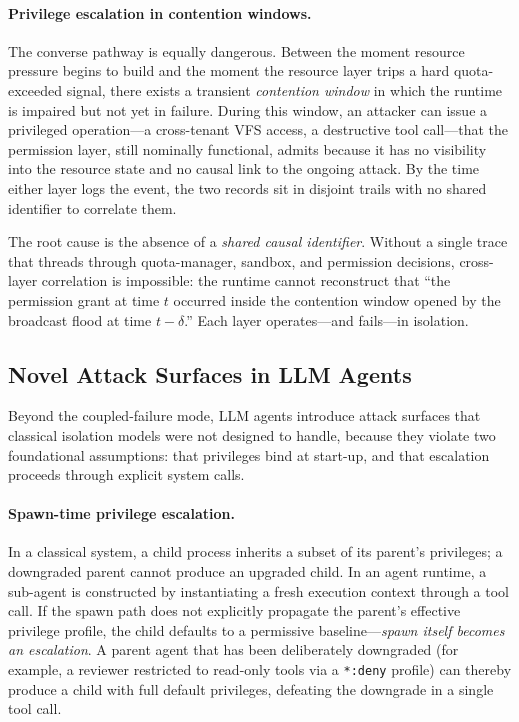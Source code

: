 \paragraph{Privilege escalation in contention windows.}
The converse pathway is equally dangerous. Between the moment resource
pressure begins to build and the moment the resource layer trips a hard
quota-exceeded signal, there exists a transient \emph{contention window} in
which the runtime is impaired but not yet in failure. During this window, an
attacker can issue a privileged operation---a cross-tenant VFS access, a
destructive tool call---that the permission layer, still nominally functional,
admits because it has no visibility into the resource state and no causal link
to the ongoing attack. By the time either layer logs the event, the two
records sit in disjoint trails with no shared identifier to correlate them.

The root cause is the absence of a \emph{shared causal identifier}.
Without a single trace that threads through quota-manager, sandbox, and
permission decisions, cross-layer correlation is impossible: the runtime
cannot reconstruct that ``the permission grant at time $t$ occurred inside the
contention window opened by the broadcast flood at time $t-\delta$.'' Each
layer operates---and fails---in isolation.

\subsection{Novel Attack Surfaces in LLM Agents}
\label{sec:bg-attack}

Beyond the coupled-failure mode, LLM agents introduce attack surfaces that
classical isolation models were not designed to handle, because they violate
two foundational assumptions: that privileges bind at start-up, and that
escalation proceeds through explicit system calls.

\paragraph{Spawn-time privilege escalation.}
In a classical system, a child process inherits a subset of its parent's
privileges; a downgraded parent cannot produce an upgraded child. In an agent
runtime, a sub-agent is constructed by instantiating a fresh execution context
through a tool call. If the spawn path does not explicitly propagate the
parent's effective privilege profile, the child defaults to a permissive
baseline---\emph{spawn itself becomes an escalation}. A parent agent that has
been deliberately downgraded (for example, a reviewer restricted to read-only
tools via a \texttt{*:deny} profile) can thereby produce a child with full
default privileges, defeating the downgrade in a single tool call.

